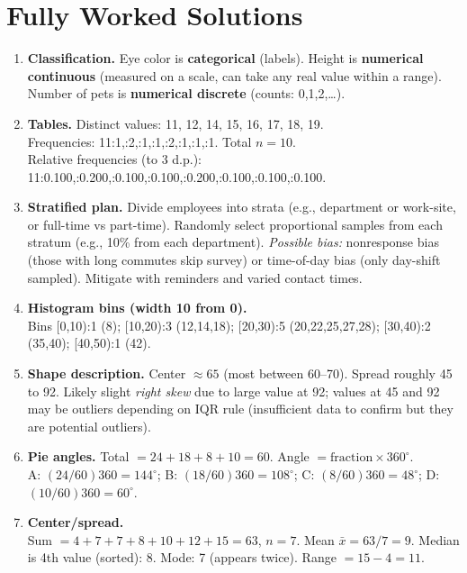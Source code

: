 \documentclass[11pt]{article}
\begin{document}
\section{Fully Worked Solutions}
\begin{enumerate}

\item \textbf{Classification.}
Eye color is \textbf{categorical} (labels). Height is \textbf{numerical continuous} (measured on a scale, can take any real value within a range). Number of pets is \textbf{numerical discrete} (counts: 0,1,2,\dots).

\item \textbf{Tables.}
Distinct values: 11, 12, 14, 15, 16, 17, 18, 19.\\
Frequencies: 11:1,:2,:1,:1,:2,:1,:1,:1. Total $n=10$.\\
Relative frequencies (to 3 d.p.): 11:0.100,:0.200,:0.100,:0.100,:0.200,:0.100,:0.100,:0.100.

\item \textbf{Stratified plan.}
Divide employees into strata (e.g., department or work-site, or full-time vs part-time). Randomly select proportional samples from each stratum (e.g., 10\% from each department). \emph{Possible bias:} nonresponse bias (those with long commutes skip survey) or time-of-day bias (only day-shift sampled). Mitigate with reminders and varied contact times.

\item \textbf{Histogram bins (width 10 from 0).}\\
Bins [0,10):1 (8); [10,20):3 (12,14,18); [20,30):5 (20,22,25,27,28); [30,40):2 (35,40); [40,50):1 (42).

\item \textbf{Shape description.}
Center $\approx 65$ (most between 60--70). Spread roughly 45 to 92. Likely slight \emph{right skew} due to large value at 92; values at 45 and 92 may be outliers depending on IQR rule (insufficient data to confirm but they are potential outliers).

\item \textbf{Pie angles.} Total $=24+18+8+10=60$. Angle $=\text{fraction}\times 360^\circ$.\\
A: $(24/60)360=144^\circ$;\; B: $(18/60)360=108^\circ$;\; C: $(8/60)360=48^\circ$;\; D: $(10/60)360=60^\circ$.

\item \textbf{Center/spread.}\\
Sum $=4+7+7+8+10+12+15=63$, $n=7$. Mean $\bar{x}=63/7=9$. Median is 4th value (sorted): 8. Mode: 7 (appears twice). Range $=15-4=11$.


\end{enumerate}
\end{document}
